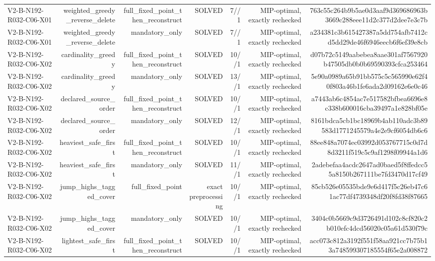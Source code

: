 {\begin{longtable}{lrrrrrr}
V2-B-N192-R032-C06-X01 & weighted\_greedy\_reverse\_delete & full\_fixed\_point\_then\_reconstruct & SOLVED & 7//1 & MIP-optimal, exactly rechecked & 763c55c264b9b5ae0d3aaf9d369686963b3669c288eee11d2c377d2dee7e3c7b \\
V2-B-N192-R032-C06-X01 & weighted\_greedy\_reverse\_delete & mandatory\_only & SOLVED & 7//1 & MIP-optimal, exactly rechecked & a234381c3b615427387a5dd754afb7412cd5dd29de46f6946eecb6f6ef39e8cb \\
V2-B-N192-R032-C06-X02 & cardinality\_greedy & full\_fixed\_point\_then\_reconstruct & SOLVED & 10//1 & MIP-optimal, exactly rechecked & d07b72c5149aabebea8aae301af7567920b47505db0b0b69590393cfca253464 \\
V2-B-N192-R032-C06-X02 & cardinality\_greedy & mandatory\_only & SOLVED & 13//1 & MIP-optimal, exactly rechecked & 5e90a0989a65b91bb575c5c565990e62f40f803a46b1fe6ada2d09162e6e0c46 \\
V2-B-N192-R032-C06-X02 & declared\_source\_order & full\_fixed\_point\_then\_reconstruct & SOLVED & 10//1 & MIP-optimal, exactly rechecked & a7443ab6c4854ac7e517582bfbea6696e8c338b600016cba39497a1e828bf05e \\
V2-B-N192-R032-C06-X02 & declared\_source\_order & mandatory\_only & SOLVED & 12//1 & MIP-optimal, exactly rechecked & 8161bdca5cb1bc18969b4ab110adc3b89583d1771245579a4e2e9cf6054db6c6 \\
V2-B-N192-R032-C06-X02 & heaviest\_safe\_first & full\_fixed\_point\_then\_reconstruct & SOLVED & 10//1 & MIP-optimal, exactly rechecked & 88ee848a7074ec03992d053767715c0d7d8d3211f519c5c9af1298f09944a1d6 \\
V2-B-N192-R032-C06-X02 & heaviest\_safe\_first & mandatory\_only & SOLVED & 11//1 & MIP-optimal, exactly rechecked & 2adebefaa4acdc2647ad0baed5f8ffedcc55a8150b267111be7fd3470d17cf49 \\
V2-B-N192-R032-C06-X02 & jump\_highs\_tagged\_cover & full\_fixed\_point & exact preprocessing & 10//1 & MIP-optimal, exactly rechecked & 85cb526e05535bde9e6d417f5c26eb47c61ac77df4739348df20f8fd38f87665 \\
V2-B-N192-R032-C06-X02 & jump\_highs\_tagged\_cover & mandatory\_only & SOLVED & 10//1 & MIP-optimal, exactly rechecked & 3404c0b5669c9d3726491d102c8cf820c2b010efc4dcd56020c05a61d530f79c \\
V2-B-N192-R032-C06-X02 & lightest\_safe\_first & full\_fixed\_point\_then\_reconstruct & SOLVED & 10//1 & MIP-optimal, exactly rechecked & acc073c812a3192f551f58aa921cc7b75b13a748599307185554f65e2a008872 \\

\end{longtable}}
